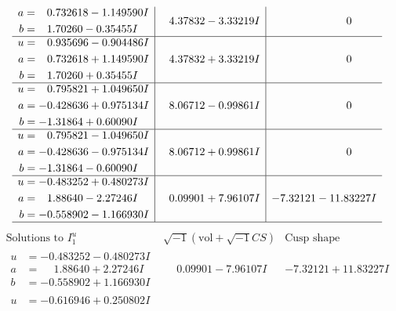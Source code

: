 \documentclass[1p]{elsarticle_modified}
\theoremstyle{definition}
\newcommand{\I}{\sqrt{-1}}
\begin{document}
$$\begin{array}{c|c|c}
\begin{aligned}
a &= \phantom{-}0.732618 - 1.149590 I \\
b &= \phantom{-}1.70260 - 0.35455 I\end{aligned}
 & \phantom{-}4.37832 - 3.33219 I & \phantom{-0.000000 } 0 \\ \hline\begin{aligned}
u &= \phantom{-}0.935696 - 0.904486 I \\
a &= \phantom{-}0.732618 + 1.149590 I \\
b &= \phantom{-}1.70260 + 0.35455 I\end{aligned}
 & \phantom{-}4.37832 + 3.33219 I & \phantom{-0.000000 } 0 \\ \hline\begin{aligned}
u &= \phantom{-}0.795821 + 1.049650 I \\
a &= -0.428636 + 0.975134 I \\
b &= -1.31864 + 0.60090 I\end{aligned}
 & \phantom{-}8.06712 - 0.99861 I & \phantom{-0.000000 } 0 \\ \hline\begin{aligned}
u &= \phantom{-}0.795821 - 1.049650 I \\
a &= -0.428636 - 0.975134 I \\
b &= -1.31864 - 0.60090 I\end{aligned}
 & \phantom{-}8.06712 + 0.99861 I & \phantom{-0.000000 } 0 \\ \hline\begin{aligned}
u &= -0.483252 + 0.480273 I \\
a &= \phantom{-}1.88640 - 2.27246 I \\
b &= -0.558902 - 1.166930 I\end{aligned}
 & \phantom{-}0.09901 + 7.96107 I & -7.32121 - 11.83227 I\\
 \hline 
 \end{array}$$\newpage$$\begin{array}{c|c|c}  
\text{Solutions to }I^u_{1}& \I (\text{vol} + \sqrt{-1}CS) & \text{Cusp shape}\\
 \hline 
\begin{aligned}
u &= -0.483252 - 0.480273 I \\
a &= \phantom{-}1.88640 + 2.27246 I \\
b &= -0.558902 + 1.166930 I\end{aligned}
 & \phantom{-}0.09901 - 7.96107 I & -7.32121 + 11.83227 I \\ \hline\begin{aligned}
u &= -0.616946 + 0.250802 I \\

\end{aligned}
\end{array}$$
\end{document}
